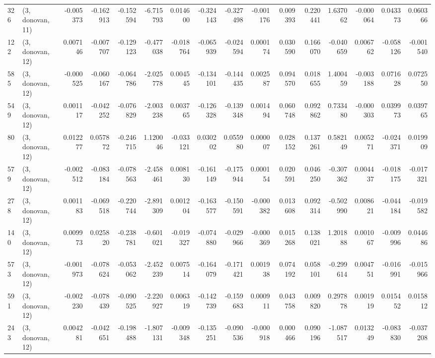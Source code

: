 \begin{tabular}{llrrrrrrrrrrrrrr}
326 &  (3, donovan, 11) &  -0.005373 & -0.162913 & -0.152594 &   -6.715793 &  0.014600 &  -0.324143 & -0.327498 & -0.001176 &  0.009393 &  0.220441 &    1.637062 & -0.000064 &  0.043373 &  0.060366 \\
122 &  (3, donovan, 12) &   0.007146 & -0.007707 & -0.129123 &   -0.477038 & -0.018764 &  -0.065939 & -0.024594 &  0.000174 &  0.030590 &  0.166070 &   -0.040659 &  0.006762 & -0.058126 & -0.001540 \\
585 &  (3, donovan, 12) &  -0.000525 & -0.060167 & -0.064786 &   -2.025778 &  0.004545 &  -0.134101 & -0.144435 &  0.002587 &  0.094570 &  0.018655 &    1.400459 & -0.003188 &  0.071628 &  0.072550 \\
549 &  (3, donovan, 12) &   0.001117 & -0.042252 & -0.076829 &   -2.003238 &  0.003765 &  -0.126328 & -0.139348 &  0.001494 &  0.060748 &  0.092862 &    0.733480 & -0.000303 &  0.039973 &  0.039765 \\
80  &  (3, donovan, 12) &   0.012277 &  0.057872 & -0.246715 &    1.120046 & -0.033121 &   0.030202 &  0.055980 &  0.000007 &  0.028152 &  0.137261 &    0.582149 &  0.005271 & -0.024371 &  0.019909 \\
579 &  (3, donovan, 12) &  -0.002512 & -0.083184 & -0.078563 &   -2.458461 &  0.008130 &  -0.161149 & -0.175944 &  0.000154 &  0.020591 &  0.046250 &   -0.307362 &  0.004437 & -0.018175 & -0.017321 \\
278 &  (3, donovan, 12) &   0.001183 & -0.069518 & -0.220744 &   -2.891309 &  0.001204 &  -0.163577 & -0.150591 & -0.000382 &  0.013608 &  0.092314 &   -0.502990 &  0.008621 & -0.044184 & -0.019582 \\
140 &  (3, donovan, 12) &   0.009973 &  0.025820 & -0.238781 &   -0.601021 & -0.019327 &  -0.074880 & -0.029966 & -0.000369 &  0.015268 &  0.138021 &    1.201888 &  0.001067 & -0.009996 &  0.044686 \\
573 &  (3, donovan, 12) &  -0.001973 & -0.078624 & -0.053062 &   -2.452239 &  0.007514 &  -0.164079 & -0.171421 &  0.001938 &  0.074192 &  0.058101 &   -0.299614 &  0.004751 & -0.016991 & -0.015966 \\
591 &  (3, donovan, 12) &  -0.002230 & -0.078439 & -0.090525 &   -2.220927 &  0.006319 &  -0.142739 & -0.159683 &  0.000911 &  0.043758 &  0.009820 &    0.297878 &  0.001919 &  0.015452 &  0.015812 \\
243 &  (3, donovan, 12) &   0.004281 & -0.042651 & -0.198488 &   -1.807131 & -0.009348 &  -0.135251 & -0.090536 & -0.000918 &  0.000466 &  0.090196 &   -1.087517 &  0.013249 & -0.083830 & -0.037208 \\

\end{tabular}
